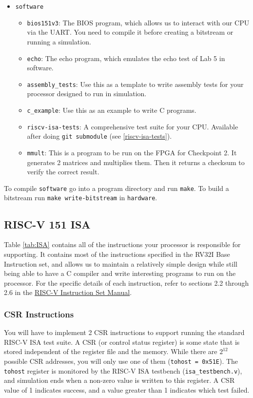 \documentclass[11pt]{article}
\begin{document}
\begin{itemize}
\begin{itemize}
    \end{itemize}
  \item \texttt{software}
    \begin{itemize}
      \item \verb|bios151v3|: The BIOS program, which allows us to interact with our CPU via the UART. You need to compile it before creating a bitstream or running a simulation.
      \item \verb|echo|: The echo program, which emulates the echo test of Lab 5 in software.
      \item \verb|assembly_tests|: Use this as a template to write assembly tests for your processor designed to run in simulation.
      \item \verb|c_example|: Use this as an example to write C programs.
      \item \verb|riscv-isa-tests|: A comprehensive test suite for your CPU. Available after doing \verb|git submodule| (see \ref{riscv-isa-tests}).
      \item \verb|mmult|: This is a program to be run on the FPGA for Checkpoint 2. It generates 2 matrices and multiplies them. Then it returns a checksum to verify the correct result.
    \end{itemize}
\end{itemize}

To compile \texttt{software} go into a program directory and run \texttt{make}.
To build a bitstream run \texttt{make write-bitstream} in \texttt{hardware}.

\subsection{RISC-V 151 ISA}
Table \ref{tab:ISA} contains all of the instructions your processor is responsible for supporting.
It contains most of the instructions specified in the RV32I Base Instruction set, and allows us to maintain a relatively simple design while still being able to have a C compiler and write interesting programs to run on the processor.
For the specific details of each instruction, refer to sections 2.2 through 2.6 in the \href{https://github.com/riscv/riscv-isa-manual/releases/download/Ratified-IMAFDQC/riscv-spec-20191213.pdf}{RISC-V Instruction Set Manual}.

\subsubsection{CSR Instructions}
You will have to implement 2 CSR instructions to support running the standard RISC-V ISA test suite.
A CSR (or control status register) is some state that is stored independent of the register file and the memory.
While there are $2^{12}$ possible CSR addresses, you will only use one of them (\texttt{tohost = 0x51E}).
The \texttt{tohost} register is monitored by the RISC-V ISA testbench (\verb|isa_testbench.v|), and simulation ends when a non-zero value is written to this register.
A CSR value of 1 indicates success, and a value greater than 1 indicates which test failed.
\end{document}
